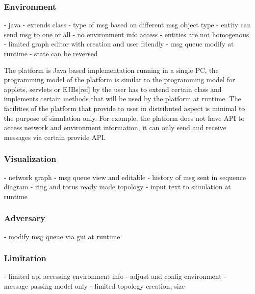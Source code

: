 \subsubsection{Environment}
- java
- extends class
- type of msg based on different msg object type
- entity can send msg to one or all
- no environment info access
- entities are not homogenous
- limited graph editor with creation and user friendly
- msg queue modify at runtime 
- state can be reversed


The platform is Java based implementation running in a single PC, the programming model of the platform is similar to the programming model for applets, servlets or EJBs[ref] by the user has to extend certain class and implements certain methods that will be used by the platform at runtime. The facilities of the platform that provide to user in distributed aspect is minimal to the purpose of simulation only. For example, the platform does not have API to access network and environment information, it can only send and receive messages via certain provide API.

\subsubsection{Visualization}
- network graph
- msg queue view and editable
- history of msg sent in sequence diagram
- ring and torus ready made topology
- input text to simulation at runtime

\subsubsection{Adversary}
- modify msg queue via gui at runtime

\subsubsection{Limitation}
- limited api accessing environment info
- adjust and config environment 
- message passing model only
- limited topology creation, size


